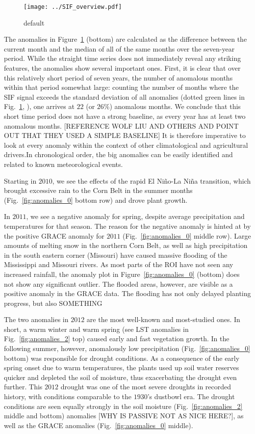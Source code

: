 \documentclass[review, a4paper, 10pt, times]{elsarticle}
\begin{document}
\begin{figure}[htbp]
\centering
\texttt{[image: ../SIF\_overview.pdf]}
\caption{default}
\label{fig:sif_ts}
\end{figure}

The anomalies in Figure~\ref{fig:sif_ts} (bottom) are calculated as the difference between the current month and the median of all of the same months over the seven-year period. While the straight time series does not immediately reveal any striking features, the anomalies show several important ones. First, it is clear that over this relatively short period of seven years, the number of anomalous months within that period somewhat large: counting the number of months where the SIF signal exceeds the standard deviation of all anomalies (dotted green lines in Fig.~\ref{fig:sif_ts}, ), one arrives at $22$ (or $26\%$) anomalous months. We conclude that this short time period does not have a strong baseline, as every year has at least two anomalous months. [REFERENCE WOLF LIU AND OTHERS AND POINT OUT THAT THEY USED A SIMPLE BASELINE] It is therefore imperative to look at every anomaly within the context of other climatological and agricultural drivers.In chronological order, the big anomalies can be easily identified and related to known meteorological events. 

Starting in $2010$, we see the effects of the rapid El Ni\~no-La Ni\~na transition, which brought excessive rain to the Corn Belt in the summer months (Fig.~\ref{fig:anomalies_0} bottom row) and drove plant growth.

In $2011$, we see a negative anomaly for spring, despite average precipitation and temperatures for that season. The reason for the negative anomaly is hinted at by the positive GRACE anomaly for $2011$ (Fig.~\ref{fig:anomalies_0} middle row). Large amounts of melting snow in the northern Corn Belt, as well as high precipitation in the south eastern corner (Missouri) have caused massive flooding of the Mississippi and Missouri rivers. As most parts of the ROI have not seen any increased rainfall, the anomaly plot in Figure~\ref{fig:anomalies_0} (bottom) does not show any significant outlier. The flooded areas, however, are visible as a positive anomaly in the GRACE data. The flooding has not only delayed planting progress, but also SOMETHING

The two anomalies in $2012$ are the most well-known and most-studied ones. In short, a warm winter and warm spring (see LST anomalies in Fig.~\ref{fig:anomalies_2} top) caused early and fast vegetation growth. In the following summer, however, anomalously low precipitation (Fig.~\ref{fig:anomalies_0} bottom) was responsible for drought conditions. As a consequence of the early spring onset due to warm temperatures, the plants used up soil water reserves quicker and depleted the soil of moisture, thus exacerbating the drought even further. This $2012$ drought was one of the most severe droughts in recorded history, with conditions comparable to the $1930$'s dustbowl era. The drought conditions are seen equally strongly in the soil moisture (Fig.~\ref{fig:anomalies_2} middle and bottom) anomalies [WHY IS PASSIVE NOT AS NICE HERE?], as well as the GRACE anomalies (Fig.~\ref{fig:anomalies_0} middle). 
\end{document}

